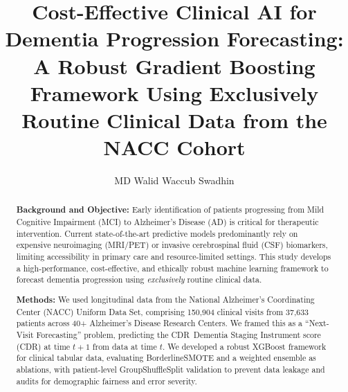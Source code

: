 \documentclass[preprint,12pt]{elsarticle}
\begin{document}
\begin{frontmatter}

\title{Cost-Effective Clinical AI for Dementia Progression Forecasting: A Robust Gradient Boosting Framework Using Exclusively Routine Clinical Data from the NACC Cohort}

\author[ruet]{MD Walid Waccub Swadhin}



\begin{abstract}
\textbf{Background and Objective:} Early identification of patients progressing from Mild Cognitive Impairment (MCI) to Alzheimer's Disease (AD) is critical for therapeutic intervention. Current state-of-the-art predictive models predominantly rely on expensive neuroimaging (MRI/PET) or invasive cerebrospinal fluid (CSF) biomarkers, limiting accessibility in primary care and resource-limited settings. This study develops a high-performance, cost-effective, and ethically robust machine learning framework to forecast dementia progression using \textit{exclusively} routine clinical data.

\vspace{0.5em}
\textbf{Methods:} We used longitudinal data from the National Alzheimer's Coordinating Center (NACC) Uniform Data Set, comprising 150,904 clinical visits from 37,633 patients across 40+ Alzheimer's Disease Research Centers. We framed this as a ``Next-Visit Forecasting'' problem, predicting the CDR\textregistered\ Dementia Staging Instrument score (CDR) at time $t+1$ from data at time $t$. We developed a robust XGBoost framework for clinical tabular data, evaluating BorderlineSMOTE and a weighted ensemble as ablations, with patient-level GroupShuffleSplit validation to prevent data leakage and audits for demographic fairness and error severity.


\end{abstract}
\end{frontmatter}
\end{document}
